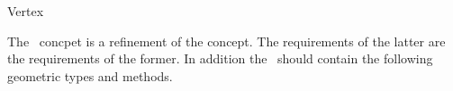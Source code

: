 
\ccRefPageBegin


\begin{ccRefConcept}{Vertex}


The \ccRefName\ concpet is a refinement of the  concept. 
The requirements of the latter are the requirements of the former.
In addition the \ccRefName\ should contain the  following geometric types and methods.

  \ccTypes
{}

  \ccOperations
  

\end{ccRefConcept} %

\ccRefPageEnd
